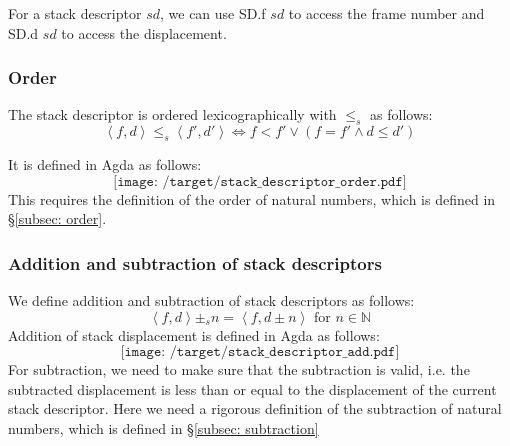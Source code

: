 \documentclass[12pt,twoside,a4paper]{report}
\theoremstyle{definition}
\theoremstyle{definition}
\theoremstyle{definition}
\theoremstyle{definition}
\newcommand{\secref}[1]{\S\ref{#1}}
\newcommand{\dpink}[1]{\textcolor{darkpink}{#1}}
\newcommand{\ang}[1]{\left\langle #1 \right\rangle}
\begin{document}
    For a stack descriptor $sd$, we can use \dpink{SD.f} $sd$ to access the frame number and \dpink{SD.d} $sd$ to access the displacement. 

    \subsubsection{Order}
    The stack descriptor is ordered lexicographically with $\leq_s$ as follows:
    \[\ang{f, d} \leq_s \ang{f', d'} \Leftrightarrow f < f' \lor (f = f' \land d \leq d')\]

    It is defined in Agda as follows:
    \[\texttt{[image: /target/stack\_descriptor\_order.pdf]}\]
    This requires the definition of the order of natural numbers, which is defined in \secref{subsec: order}.

    \subsubsection{Addition and subtraction of stack descriptors}
    We define addition and subtraction of stack descriptors as follows:
    \[\ang{f, d} \pm_s n = \ang{f, d \pm n} \text{ for } n \in \mathbb{N}\]
    Addition of stack displacement is defined in Agda as follows:
    \[\texttt{[image: /target/stack\_descriptor\_add.pdf]}\]
    For subtraction, we need to make sure that the subtraction is valid, i.e. the subtracted displacement is less than or equal to the displacement of the current stack descriptor. Here we need a rigorous definition of the subtraction of natural numbers, which is defined in \secref{subsec: subtraction}
\end{document}
